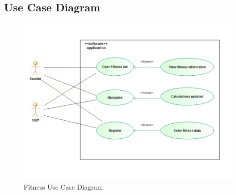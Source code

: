 \newpage

\subsection{Use Case Diagram}
\begin{figure}[H]
	\centering
	\includegraphics[scale=0.54]{Fitness/fitness_use_case_diagram.png}
	\caption{Fitness Use Case Diagram}
	\label{fig:Fitness_Use_Case_Diagram}
\end{figure}
